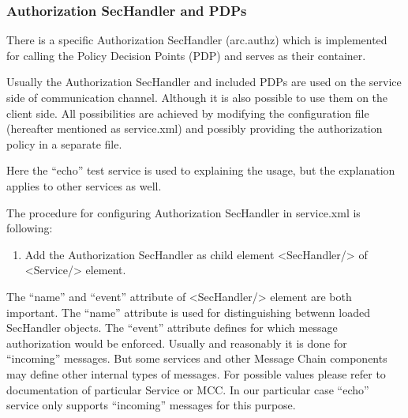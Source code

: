 \documentclass{article}
\newcommand\liststyleWWviiiNumxi{%
\renewcommand\theenumi{\arabic{enumi}}
\renewcommand\theenumii{\arabic{enumii}}
\renewcommand\theenumiii{\arabic{enumiii}}
\renewcommand\theenumiv{\arabic{enumiv}}
\renewcommand\labelenumi{\theenumi.}
\renewcommand\labelenumii{\theenumii.}
\renewcommand\labelenumiii{\theenumiii.}
\renewcommand\labelenumiv{\theenumiv.}
}
\begin{document}
\subsubsection[Authorization SecHandler and PDPs]{Authorization
SecHandler and PDPs}
{\color{black}
There is a specific Authorization SecHandler (arc.authz) which is
implemented for calling the Policy Decision Points (PDP) and serves as
their container. }

{\color{black}
Usually the Authorization SecHandler and included PDPs are used on the
service side of communication channel. Although it is also possible to
use them on the client side. All possibilities are achieved by
modifying the configuration file (hereafter mentioned as service.xml)
and possibly providing the authorization policy in a separate file.}

{\color{black}
Here the {\textquotedblleft}echo{\textquotedblright} test service is
used to explaining the usage, but the explanation applies to other
services as well.}

{\color{black}
The procedure for configuring Authorization SecHandler in service.xml is
following:}

\liststyleWWviiiNumxi
\begin{enumerate}
\item {\color{black}
Add the Authorization SecHandler as child element
{\textless}SecHandler/{\textgreater} of
{\textless}Service/{\textgreater} element. }
\end{enumerate}
{\color{black}
The {\textquotedblleft}name{\textquotedblright} and
{\textquotedblleft}event{\textquotedblright} attribute of
{\textless}SecHandler/{\textgreater} element are both important. The
{\textquotedblleft}name{\textquotedblright} attribute is used for
distinguishing betwenn loaded SecHandler objects. The
{\textquotedblleft}event{\textquotedblright} attribute defines for
which message authorization would be enforced. Usually and reasonably
it is done for {\textquotedblleft}incoming{\textquotedblright}
messages. But some services and other Message Chain components may
define other internal types of messages. For possible values please
refer to documentation of particular Service or MCC. In our particular
case {\textquotedblleft}echo{\textquotedblright} service only supports
{\textquotedblleft}incoming{\textquotedblright} messages for this
purpose.}
\end{document}
